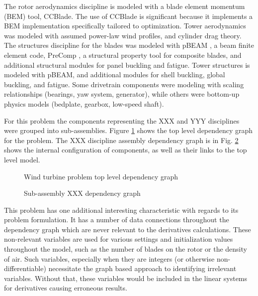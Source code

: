 \documentclass[]{aiaa-tc} %
\begin{document}
    The rotor aerodynamics discipline is modeled with a blade element momentum (BEM)
    tool, CCBlade\cite{NING:BEM}. The use of CCBlade is significant because it implements
    a BEM implementation specifically tailored to optimization.  Tower aerodynamics was 
    modeled with assumed power-law wind profiles, and cylinder drag theory.
    The structures discipline for the blades was modeled with pBEAM \cite{Ning2013b},
    a beam finite element code, PreComp \cite{Bir2005}, a structural property tool for
    composite blades, and additional structural modules for panel buckling and fatigue.
    Tower structures is modeled with pBEAM, and additional modules for shell buckling,
    global buckling, and fatigue.  Some drivetrain components were modeling with scaling
    relationships (bearings, yaw system, generator), while others were bottom-up physics
    models (bedplate, gearbox, low-speed shaft).

     For this
    problem the components representing the XXX and YYY disciplines were
    grouped into sub-assemblies. Figure \ref{fig:wt_top_depgraph} shows the
    top level dependency graph for the problem. The XXX discipline assembly dependency
    graph is in Fig. \ref{fig:wt_sub_depgraph} shows the internal configuration
    of components, as well as their links to the top level model.

    \begin{figure}[!htbp]
        \caption{Wind turbine problem top level dependency graph}
        \label{fig:wt_top_depgraph}
    \end{figure}

    \begin{figure}[!htbp]
        \caption{Sub-assembly XXX dependency graph}
        \label{fig:wt_sub_depgraph}
    \end{figure}


    This problem has one additional interesting characteristic with regards to its
    problem formulation. It has a number of data connections throughout the dependency
    graph which are never relevant to the derivatives calculations. These non-relevant
    variables are used for various settings and initialization values throughout the
    model, such as the number of blades on the rotor or the density of air. 
    Such variables, especially when they are integers (or otherwise non-differentiable)
    necessitate the graph based approach to identifying irrelevant variables. Without that, these
    variables would be included in the linear systems for derivatives causing erroneous
    results. 
\end{document}
